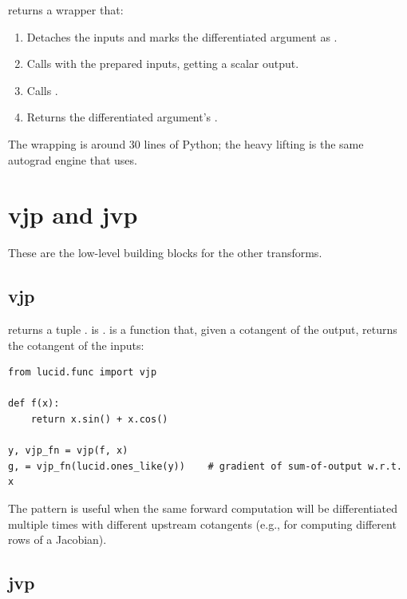  returns a wrapper that:

\begin{enumerate}
  \item Detaches the inputs and marks the differentiated argument
    as .
  \item Calls  with the prepared inputs, getting a
    scalar output.
  \item Calls .
  \item Returns the differentiated argument's .
\end{enumerate}

The wrapping is around 30 lines of Python; the heavy lifting is
the same autograd engine that  uses.

\section{vjp and jvp}
\label{sec:higher_order:vjp_jvp}

These are the low-level building blocks for the other transforms.

\subsection{vjp}
\label{ssec:higher_order:vjp}

 returns a tuple .  is .  is
a function that, given a cotangent of the output, returns the
cotangent of the inputs:

\begin{lstlisting}[style=lucid,language=LucidPython]
from lucid.func import vjp

def f(x):
    return x.sin() + x.cos()

y, vjp_fn = vjp(f, x)
g, = vjp_fn(lucid.ones_like(y))    # gradient of sum-of-output w.r.t. x
\end{lstlisting}

The pattern is useful when the same forward computation will be
differentiated multiple times with different upstream cotangents
(e.g., for computing different rows of a Jacobian).

\subsection{jvp}
\label{ssec:higher_order:jvp}

